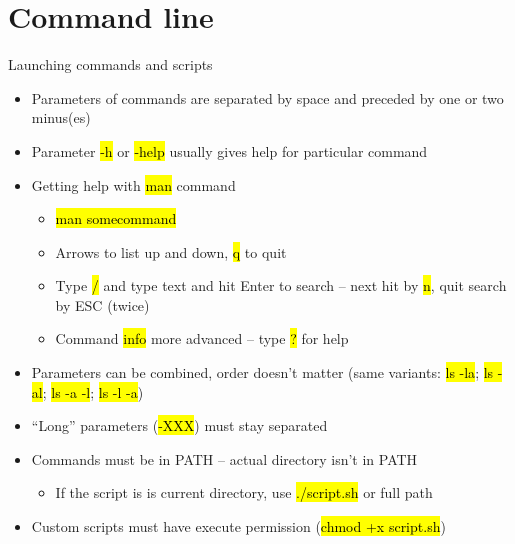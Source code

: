 \documentclass[compress, ucs, xelatex, 11pt, xcolor=svgnames,
  hyperref={
    bookmarks=true,
    unicode=true,
    colorlinks=true,
    pdftitle={Linux, command line and MetaCentrum},
    plainpages=false,
    pdfauthor={Vojtech Zeisek},
    pdfsubject={Course about use of Linux command line, writing shell scripts and using MetaCentrum of CESNET},
    pdfcreator={XeLaTeX},
    pdfkeywords={Linux, GNU, BASH, shell, command line, MetaCentrum},
    linkcolor=Red,
    anchorcolor=Blue,
    citecolor=Purple,
    filecolor=DodgerBlue,
    menucolor=DarkOrchid,
    urlcolor=DeepSkyBlue,
    pdftex},
  url={hyphens, lowtilde} %
  ]{beamer}
\renewcommand{\texttt}[1]{\hl{\ttfamily #1}}
\begin{document}
\section{Command line}

\begin{frame}{Launching commands and scripts}
\begin{itemize}
  \item Parameters of commands are separated by space and preceded by one or two minus(es)
  \item Parameter \texttt{-h} or \texttt{{-}-help} usually gives help for particular command
  \item Getting help with \texttt{man} command
  \begin{itemize}
    \item \texttt{man somecommand}
    \item Arrows to list up and down, \texttt{q} to quit
    \item Type \texttt{/} and type text and hit Enter to search -- next hit by \texttt{n}, quit search by ESC (twice)
    \item Command \texttt{info} more advanced -- type \texttt{?} for help
  \end{itemize}
  \item Parameters can be combined, order doesn't matter (same variants: \texttt{ls -la}; \texttt{ls -al}; \texttt{ls -a -l}; \texttt{ls -l -a})
  \item ``Long'' parameters (\texttt{{-}-XXX}) must stay separated
  \item Commands must be in PATH -- actual directory isn't in PATH
  \begin{itemize}
    \item If the script is is current directory, use \texttt{./script.sh} or full path
  \end{itemize}
  \item Custom scripts must have execute permission (\texttt{chmod +x script.sh})
\end{itemize}
\end{frame}
\end{document}
